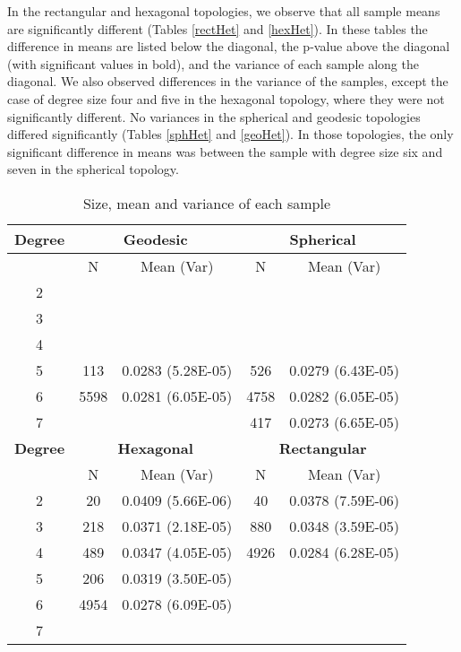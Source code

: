 In the rectangular and hexagonal topologies, we observe that all sample means
are significantly different (Tables \ref{rectHet} and \ref{hexHet}). In these
tables 
 the difference in means are listed below the diagonal, the p-value above the
diagonal (with significant values in bold), and the variance of each
sample along the diagonal. We also observed differences in the variance of
the samples, except the case of degree size four and five in the hexagonal
topology, where they were not significantly different. No variances in the
spherical and geodesic topologies differed significantly (Tables \ref{sphHet}
and \ref{geoHet}).  In those topologies,
the only significant difference in means was between the sample with degree size
six and seven in the spherical topology.


\begin{table}[htb]
\centering
\scriptsize
\caption{Size, mean and variance of each sample}
\label{meanvar1}
\begin{tabular}{|c||cc|cc|}
\hline
\textbf{Degree} & \multicolumn{2}{c|}{\textbf{Geodesic}} &
\multicolumn{2}{c|}{\textbf{Spherical}} 
 \\
\hline
& N & Mean (Var) & N & Mean (Var)  \\
\hline
2&&&&\\ 
3&&&&\\ 
4&&&&\\ 
5& 113& 0.0283 (5.28E-05)& 526& 0.0279 (6.43E-05)\\ 
6& 5598& 0.0281 (6.05E-05)& 4758& 0.0282 (6.05E-05)\\ 
7&&& 417& 0.0273 (6.65E-05)\\ 
\hline
\textbf{Degree} & \multicolumn{2}{c|}{\textbf{Hexagonal}} &
\multicolumn{2}{c|}{\textbf{Rectangular}} \\
\hline
& N & Mean (Var) & N & Mean (Var)  \\
\hline
2& 20& 0.0409 (5.66E-06)& 40& 0.0378 (7.59E-06)\\ 
3& 218& 0.0371 (2.18E-05)& 880& 0.0348 (3.59E-05)\\ 
4& 489& 0.0347 (4.05E-05)& 4926& 0.0284 (6.28E-05)\\ 
5&  206& 0.0319 (3.50E-05)&&\\ 
6&  4954& 0.0278 (6.09E-05)&&\\ 
7&&&&\\ 
\hline
\hline
\end{tabular} \end{table}


